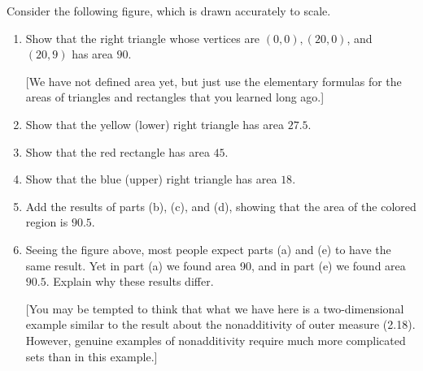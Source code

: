 \begin{exercise}\label{chapter2:sectionA:exercise14}
    Consider the following figure, which is drawn accurately to scale.
    \begin{center}
    \end{center}

    \begin{enumerate}[label={(\alph*)}]
        \item Show that the right triangle whose vertices are $(0, 0), (20, 0)$, and $(20, 9)$ has area $90$.

                  [We have not defined area yet, but just use the elementary formulas for the areas of triangles and rectangles that you learned long ago.]
        \item Show that the yellow (lower) right triangle has area $27.5$.
        \item Show that the red rectangle has area $45$.
        \item Show that the blue (upper) right triangle has area $18$.
        \item Add the results of parts (b), (c), and (d), showing that the area of the colored region is $90.5$.
        \item Seeing the figure above, most people expect parts (a) and (e) to have the same result. Yet in part (a) we found area 90, and in part (e) we found area $90.5$. Explain why these results differ.

                  [You may be tempted to think that what we have here is a two-dimensional example similar to the result about the nonadditivity of outer measure (2.18). However, genuine examples of nonadditivity require much more complicated sets than in this example.]
    \end{enumerate}
\end{exercise}

